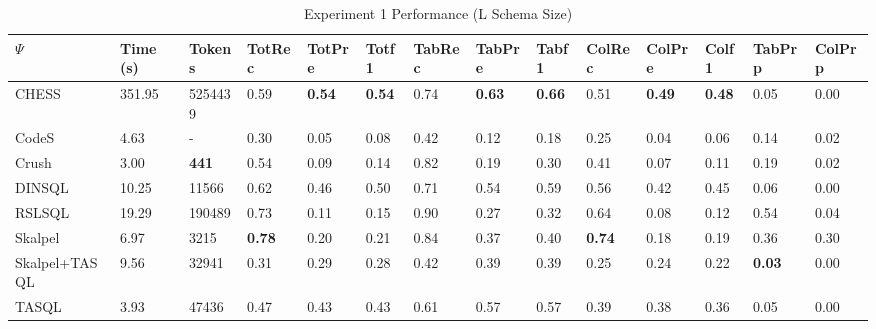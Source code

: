 \begin{table}
\caption{Experiment 1 Performance (L Schema Size)}
\label{tab:exp1-l-schema}
\begin{tabular}{llllllllllllll}
\toprule
$\Psi$ & Time (s) & Tokens & TotRec & TotPre & Totf1 & TabRec & TabPre & Tabf1 & ColRec & ColPre & Colf1 & TabPrp & ColPrp \\
\midrule
CHESS & 351.95 & 5254439 & 0.59 & \textbf{0.54} & \textbf{0.54} & 0.74 & \textbf{0.63} & \textbf{0.66} & 0.51 & \textbf{0.49} & \textbf{0.48} & 0.05 & 0.00 \\
CodeS & 4.63 & - & 0.30 & 0.05 & 0.08 & 0.42 & 0.12 & 0.18 & 0.25 & 0.04 & 0.06 & 0.14 & 0.02 \\
Crush & 3.00 & \textbf{441} & 0.54 & 0.09 & 0.14 & 0.82 & 0.19 & 0.30 & 0.41 & 0.07 & 0.11 & 0.19 & 0.02 \\
DINSQL & 10.25 & 11566 & 0.62 & 0.46 & 0.50 & 0.71 & 0.54 & 0.59 & 0.56 & 0.42 & 0.45 & 0.06 & 0.00 \\
RSLSQL & 19.29 & 190489 & 0.73 & 0.11 & 0.15 & 0.90 & 0.27 & 0.32 & 0.64 & 0.08 & 0.12 & 0.54 & 0.04 \\
Skalpel & 6.97 & 3215 & \textbf{0.78} & 0.20 & 0.21 & 0.84 & 0.37 & 0.40 & \textbf{0.74} & 0.18 & 0.19 & 0.36 & 0.30 \\
Skalpel+TASQL & 9.56 & 32941 & 0.31 & 0.29 & 0.28 & 0.42 & 0.39 & 0.39 & 0.25 & 0.24 & 0.22 & \textbf{0.03} & 0.00 \\
TASQL & 3.93 & 47436 & 0.47 & 0.43 & 0.43 & 0.61 & 0.57 & 0.57 & 0.39 & 0.38 & 0.36 & 0.05 & 0.00 \\
\bottomrule
\end{tabular}
\end{table}
